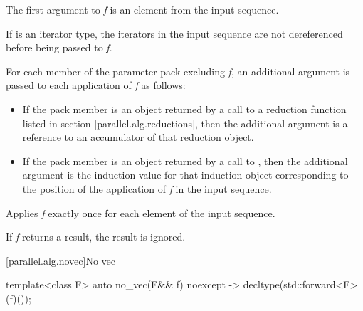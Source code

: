 \begin{itemdescr}
The first argument to {\em f} is an element from the input sequence.\begin{note}If  is an iterator type, the iterators in the input sequence are not dereferenced before being passed to {\em f}.\end{note} For each member of the  parameter pack excluding {\em f}, an additional argument is passed to each application of {\em f} as follows:

\begin{itemize}
\item If the pack member is an object returned by a call to a reduction function listed in section [parallel.alg.reductions], then the additional argument is a reference to an accumulator of that reduction object.

\item If the pack member is an object returned by a call to , then the additional argument is the induction value for that induction object corresponding to the position of the application of {\em f} in the input sequence.
\end{itemize}

\pnum \complexity Applies {\em f} exactly once for each element of the input sequence.

\pnum \remarks If {\em f} returns a result, the result is ignored.

\end{itemdescr}

[parallel.alg.novec]{No vec}

\begin{itemdecl}
template<class F>
  auto no_vec(F&& f) noexcept -> decltype(std::forward<F>(f)());
\end{itemdecl}

